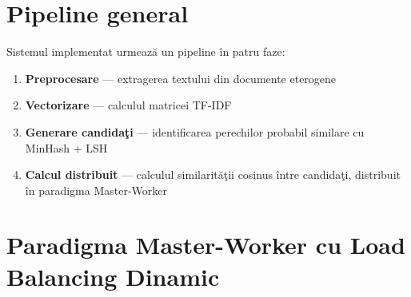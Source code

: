 \documentclass[a4paper,12pt]{report}
\begin{document}
\section{Pipeline general}

Sistemul implementat urmeaz\u{a} un pipeline \^{i}n patru faze:

\begin{enumerate}
  \item \textbf{Preprocesare} — extragerea textului din documente eterogene
  \item \textbf{Vectorizare} — calculul matricei TF-IDF
  \item \textbf{Generare candida\c{t}i} — identificarea perechilor probabil similare cu MinHash + LSH
  \item \textbf{Calcul distribuit} — calculul similarit\u{a}\c{t}ii cosinus \^{i}ntre candida\c{t}i, distribuit \^{i}n paradigma Master-Worker
\end{enumerate}

\section{Paradigma Master-Worker cu Load Balancing Dinamic}
\end{document}
